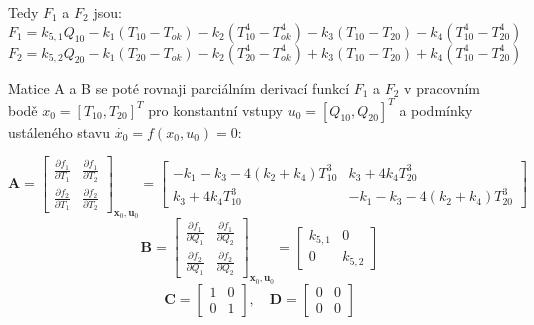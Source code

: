 \documentclass[12pt]{article} %
\begin{document}
Tedy $F_1$ a $F_2$ jsou:
\begin{equation}
    \label{eq:F1}
F_1 = k_{5,1} Q_{10} - k_1(T_{10} - T_{ok}) - k_2(T_{10}^4 - T_{ok}^4) - k_3(T_{10} - T_{20}) - k_4(T_{10}^4 - T_{20}^4)
\end{equation}
\begin{equation}
    \label{eq:F2}
F_2 = k_{5,2} Q_{20} - k_1(T_{20} - T_{ok}) - k_2(T_{20}^4 - T_{ok}^4) + k_3(T_{10} - T_{20}) + k_4(T_{10}^4 - T_{20}^4)
\end{equation}

Matice A a B se poté rovnaji parciálním derivací funkcí $F_1$ a $F_2$ v pracovním bodě $x_0 = [T_{10}, T_{20}]^T$ pro konstantní vstupy $u_0 = [Q_{10}, Q_{20}]^T$ a podmínky ustáleného stavu $\dot{x_0} = f(x_0, u_0) = 0$:

\begin{equation}
    \label{eq:A}
\mathbf{A} = \begin{bmatrix} \frac{\partial f_1}{\partial T_1} & \frac{\partial f_1}{\partial T_2} \\ \frac{\partial f_2}{\partial T_1} & \frac{\partial f_2}{\partial T_2} \end{bmatrix}_{\mathbf{x}_0, \mathbf{u}_0} = \begin{bmatrix} -k_1 - k_3 - 4(k_2 + k_4)T_{10}^3 & k_3 + 4k_4 T_{20}^3 \\ k_3 + 4k_4 T_{10}^3 & -k_1 - k_3 - 4(k_2 + k_4)T_{20}^3 \end{bmatrix}
\end{equation}
\begin{equation}
    \label{eq:B}
\mathbf{B} = \begin{bmatrix} \frac{\partial f_1}{\partial Q_1} & \frac{\partial f_1}{\partial Q_2} \\ \frac{\partial f_2}{\partial Q_1} & \frac{\partial f_2}{\partial Q_2} \end{bmatrix}_{\mathbf{x}_0, \mathbf{u}_0} = \begin{bmatrix} k_{5,1} & 0 \\ 0 & k_{5,2} \end{bmatrix}
\end{equation}
\begin{equation}
    \label{eq:C_D}
\mathbf{C} = \begin{bmatrix} 1 & 0 \\ 0 & 1 \end{bmatrix}, \quad \mathbf{D} = \begin{bmatrix} 0 & 0 \\ 0 & 0 \end{bmatrix}
\end{equation}
\end{document}
